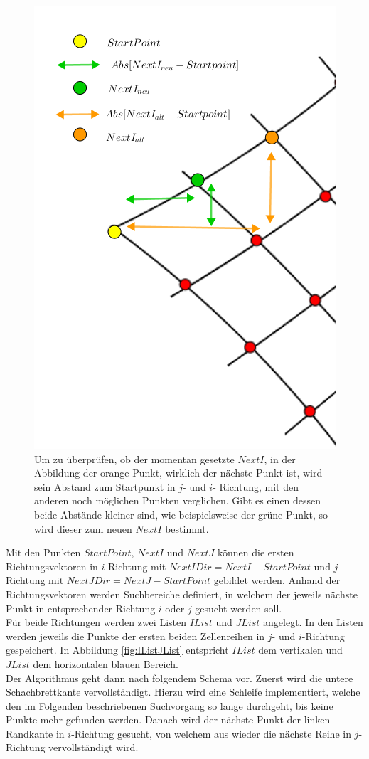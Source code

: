 \begin{figure}[!htb]
	\centering
	\includegraphics[width=0.5\linewidth]{images/SearchNextI.png}
	\caption[Überprüfung des gefundenen $NextI$]{Um zu überprüfen, ob der momentan gesetzte $NextI$, in der Abbildung der orange Punkt, wirklich der nächste Punkt ist, wird sein Abstand zum Startpunkt in $j$- und  $i$- Richtung, mit den anderen noch möglichen Punkten verglichen. Gibt es einen dessen beide Abstände kleiner sind, wie beispielsweise der grüne Punkt, so wird dieser zum neuen $NextI$ bestimmt.}
	\label{fig:FindNextIJ}
\end{figure}
\pagebreak


Mit den Punkten $StartPoint$, $NextI$ und $NextJ$ können die ersten Richtungsvektoren in $i$-Richtung mit $NextIDir= NextI - StartPoint$ und $j$- Richtung mit $NextJDir =NextJ-StartPoint$ gebildet werden. Anhand der Richtungsvektoren werden Suchbereiche definiert, in welchem der jeweils nächste Punkt in entsprechender Richtung $i$ oder $j$ gesucht werden soll.\\ 


Für beide Richtungen werden zwei Listen $IList$ und $JList$ angelegt. In den Listen werden jeweils die Punkte der ersten beiden Zellenreihen in $j$- und $i$-Richtung gespeichert. In Abbildung \ref{fig:IListJList} entspricht $IList$ dem vertikalen und $JList$ dem horizontalen blauen Bereich. \\


Der Algorithmus geht dann nach folgendem Schema vor. Zuerst wird die untere Schachbrettkante vervollständigt. Hierzu wird eine Schleife implementiert, welche den im Folgenden beschriebenen Suchvorgang so lange durchgeht, bis keine Punkte mehr gefunden werden. Danach wird der nächste Punkt der linken Randkante in $i$-Richtung gesucht, von welchem aus wieder die nächste Reihe in $j$-Richtung vervollständigt wird.\\

